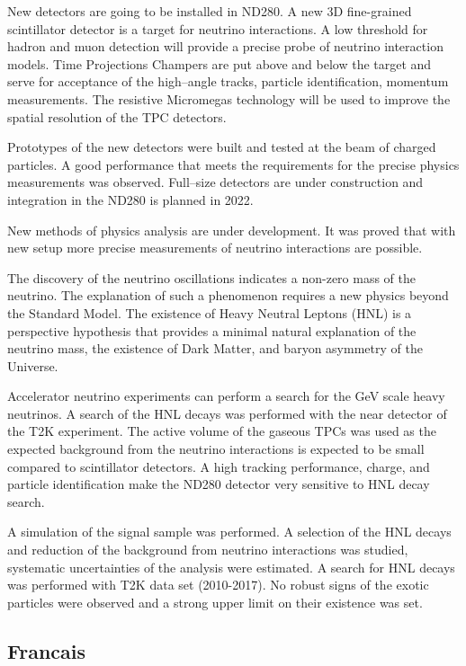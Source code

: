 \documentclass[./main.tex]{subfiles}
\begin{document}
New detectors are going to be installed in ND280. A new 3D fine-grained scintillator detector is a target for neutrino interactions. A low threshold for hadron and muon detection will provide a precise probe of neutrino interaction models. Time Projections Champers are put above and below the target and serve for acceptance of the high--angle tracks, particle identification, momentum measurements. The resistive Micromegas technology will be used to improve the spatial resolution of the TPC detectors.

Prototypes of the new detectors were built and tested at the beam of charged particles. A good performance that meets the requirements for the precise physics measurements was observed. Full--size detectors are under construction and integration in the ND280 is planned in 2022.

New methods of physics analysis are under development. It was proved that with new setup more precise measurements of neutrino interactions are possible.



The discovery of the neutrino oscillations indicates a non-zero mass of the neutrino. The explanation of such a phenomenon requires a new physics beyond the Standard Model. The existence of Heavy Neutral Leptons (HNL) is a perspective hypothesis that provides a minimal natural explanation of the neutrino mass, the existence of Dark Matter, and baryon asymmetry of the Universe.

Accelerator neutrino experiments can perform a search for the GeV scale heavy neutrinos. A search of the HNL decays was performed with the near detector of the T2K experiment. The active volume of the gaseous TPCs was used as the expected background from the neutrino interactions is expected to be small compared to scintillator detectors. A high tracking performance, charge, and particle identification make the ND280 detector very sensitive to HNL decay search.

A simulation of the signal sample was performed. A selection of the HNL decays and reduction of the background from neutrino interactions was studied, systematic uncertainties of the analysis were estimated. A search for HNL decays was performed with T2K data set (2010-2017). No robust signs of the exotic particles were observed and a strong upper limit on their existence was set.

\subsection{Francais}
\end{document}
